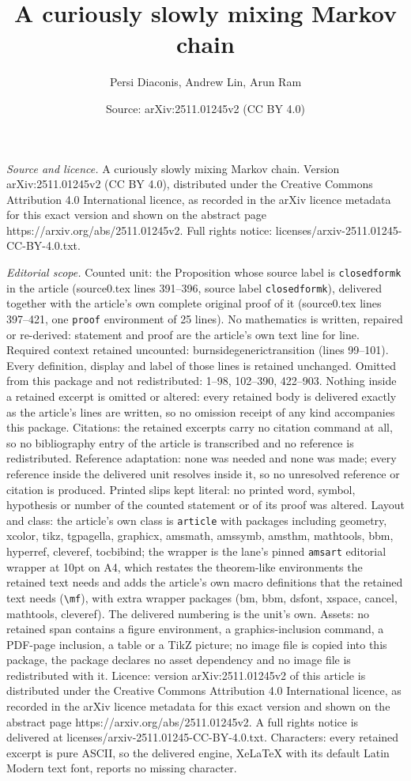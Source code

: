 \documentclass[10pt,a4paper]{amsart}
\title[A curiously slowly mixing Markov chain]{A curiously slowly mixing Markov chain}
\author{Persi Diaconis, Andrew Lin, Arun Ram}
\date{Source: arXiv:2511.01245v2 (CC BY 4.0)}
\begin{document}
\maketitle

\noindent\emph{Source and licence.} A curiously slowly mixing Markov chain. Version arXiv:2511.01245v2 (CC BY 4.0), distributed under the Creative Commons Attribution 4.0 International licence, as recorded in the arXiv licence metadata for this exact version and shown on the abstract page https://arxiv.org/abs/2511.01245v2. Full rights notice: licenses/arxiv-2511.01245-CC-BY-4.0.txt.\par\smallskip

\noindent\textit{Editorial scope.} Counted unit: the Proposition whose source label is \texttt{closedformk} in the article (source0.tex lines 391--396, source label \texttt{closedformk}), delivered together with the article's own complete original proof of it (source0.tex lines 397--421, one \texttt{proof} environment of 25 lines). No mathematics is written, repaired or re-derived: statement and proof are the article's own text line for line. Required context retained uncounted: burnsidegenerictransition (lines 99--101). Every definition, display and label of those lines is retained unchanged. Omitted from this package and not redistributed: 1--98, 102--390, 422--903. Nothing inside a retained excerpt is omitted or altered: every retained body is delivered exactly as the article's lines are written, so no omission receipt of any kind accompanies this package. Citations: the retained excerpts carry no citation command at all, so no bibliography entry of the article is transcribed and no reference is redistributed. Reference adaptation: none was needed and none was made; every reference inside the delivered unit resolves inside it, so no unresolved reference or citation is produced. Printed slips kept literal: no printed word, symbol, hypothesis or number of the counted statement or of its proof was altered. Layout and class: the article's own class is \texttt{article} with packages including geometry, xcolor, tikz, tgpagella, graphicx, amsmath, amssymb, amsthm, mathtools, bbm, hyperref, cleveref, tocbibind; the wrapper is the lane's pinned \texttt{amsart} editorial wrapper at 10pt on A4, which restates the theorem-like environments the retained text needs and adds the article's own macro definitions that the retained text needs (\texttt{\textbackslash mf}), with extra wrapper packages (bm, bbm, dsfont, xspace, cancel, mathtools, cleveref). The delivered numbering is the unit's own. Assets: no retained span contains a figure environment, a graphics-inclusion command, a PDF-page inclusion, a table or a TikZ picture; no image file is copied into this package, the package declares no asset dependency and no image file is redistributed with it. Licence: version arXiv:2511.01245v2 of this article is distributed under the Creative Commons Attribution 4.0 International licence, as recorded in the arXiv licence metadata for this exact version and shown on the abstract page https://arxiv.org/abs/2511.01245v2. A full rights notice is delivered at licenses/arxiv-2511.01245-CC-BY-4.0.txt. Characters: every retained excerpt is pure ASCII, so the delivered engine, XeLaTeX with its default Latin Modern text font, reports no missing character.
\end{document}
